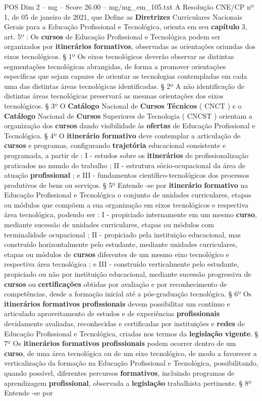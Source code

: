 \begin{textsample}{POS Dim 2 – mg – Score 26.00 – mg/mg\_em\_105.txt}
A Resolução CNE/CP nº 1, de 05 de janeiro de 2021, que Define as \textbf{Diretrizes} Curriculares Nacionais Gerais para a Educação Profissional e Tecnológica, orienta em seu \textbf{capítulo} 3, art. 5º : Os \textbf{cursos} de Educação Profissional e Tecnológica podem ser organizados por \textbf{itinerários} \textbf{formativos}, observadas as orientações oriundas dos eixos tecnológicos. § 1º Os eixos tecnológicos deverão observar as distintas segmentações tecnológicas abrangidas, de forma a promover orientações específicas que sejam capazes de orientar as tecnologias contempladas em cada uma das distintas áreas tecnológicas identificadas. § 2º A não identificação de distintas áreas tecnológicas preservará as mesmas orientações dos eixos tecnológicos. § 3º O \textbf{Catálogo} Nacional de \textbf{Cursos} \textbf{Técnicos} ( CNCT ) e o \textbf{Catálogo} Nacional de \textbf{Cursos} Superiores de Tecnologia ( CNCST ) orientam a organização dos \textbf{cursos} dando visibilidade às \textbf{ofertas} de Educação Profissional e Tecnológica. § 4º O \textbf{itinerário} \textbf{formativo} deve contemplar a articulação de \textbf{cursos} e programas, configurando \textbf{trajetória} educacional consistente e programada, a partir de : I - estudos sobre os \textbf{itinerários} de profissionalização praticados no mundo do trabalho ; II - estrutura sócio-ocupacional da área de atuação \textbf{profissional} ; e III - fundamentos científico-tecnológicos dos processos produtivos de bens ou serviços. § 5º Entende -se por \textbf{itinerário} \textbf{formativo} na Educação Profissional e Tecnológica o conjunto de unidades curriculares, etapas ou módulos que compõem a sua organização em eixos tecnológicos e respectiva área tecnológica, podendo ser : I - propiciado internamente em um mesmo \textbf{curso}, mediante sucessão de unidades curriculares, etapas ou módulos com terminalidade ocupacional ; II - propiciado pela instituição educacional, mas construído horizontalmente pelo estudante, mediante unidades curriculares, etapas ou módulos de \textbf{cursos} diferentes de um mesmo eixo tecnológico e respectiva área tecnológica ; e III - construído verticalmente pelo estudante, propiciado ou não por instituição educacional, mediante sucessão progressiva de \textbf{cursos} ou \textbf{certificações} obtidas por avaliação e por reconhecimento de competências, desde a formação inicial até a pós-graduação tecnológica. § 6º Os \textbf{itinerários} \textbf{formativos} \textbf{profissionais} devem possibilitar um contínuo e articulado aproveitamento de estudos e de experiências \textbf{profissionais} devidamente avaliadas, reconhecidas e certificadas por instituições e \textbf{redes} de Educação Profissional e Tecnológica, criadas nos termos da \textbf{legislação} \textbf{vigente}. § 7º Os \textbf{itinerários} \textbf{formativos} \textbf{profissionais} podem ocorrer dentro de um \textbf{curso}, de uma área tecnológica ou de um eixo tecnológico, de modo a favorecer a verticalização da formação na Educação Profissional e Tecnológica, possibilitando, quando possível, diferentes percursos \textbf{formativos}, incluindo programas de aprendizagem \textbf{profissional}, observada a \textbf{legislação} trabalhista pertinente. § 8º Entende -se por 
\end{textsample}

